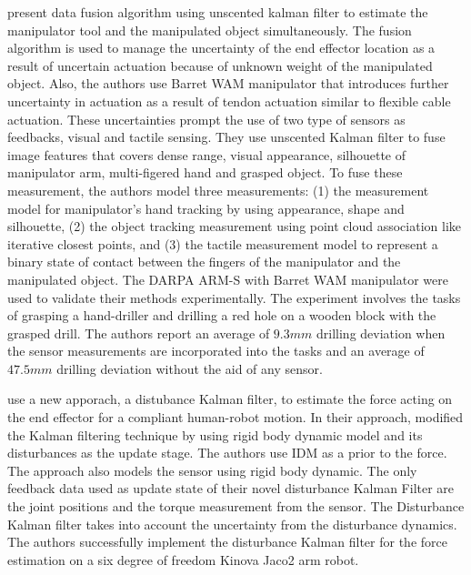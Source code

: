 \textcite{Hebert2012} present data fusion algorithm using unscented kalman filter to
estimate the manipulator tool and the manipulated object simultaneously. The fusion algorithm
is used to manage the uncertainty of the end effector location as a result of uncertain actuation
because of unknown weight of the manipulated object. Also, the authors use Barret WAM
manipulator that introduces further uncertainty in actuation as a result of tendon actuation similar
to flexible cable actuation. These uncertainties prompt the use of two type of sensors as
feedbacks, visual and tactile sensing. They use unscented Kalman filter to fuse image features
that covers dense range, visual appearance, silhouette of manipulator arm, multi-figered hand
and grasped object. To fuse these measurement, the authors model three measurements: (1)
the measurement model for manipulator’s hand tracking by using appearance, shape and
silhouette, (2) the object tracking measurement using point cloud association like iterative
closest points, and (3) the tactile measurement model to represent a binary state of contact
between the fingers of the manipulator and the manipulated object. The DARPA ARM-S
with Barret WAM manipulator were used to validate their methods experimentally. The experiment involves
the tasks of grasping a hand-driller and drilling a red hole on a wooden block with the grasped
drill. The authors report an average of $9.3 mm$ drilling deviation when the sensor measurements
are incorporated into the tasks and an average of $47.5 mm$ drilling deviation without the aid of
any sensor.

\textcite{Hu2017} use a new apporach, a distubance Kalman filter, to estimate the
force acting on the end effector for a compliant human-robot motion. In their approach, 
\textcite{Hu2017} modified the Kalman filtering technique by using rigid body dynamic model and its
disturbances as the update stage. The authors use \acrfull{IDM} as a prior to
the force. The approach also models the sensor using rigid body dynamic. The only feedback
data used as update state of their novel disturbance Kalman Filter are the joint positions and the
torque measurement from the sensor. The Disturbance Kalman filter takes into account the
uncertainty from the disturbance dynamics. The authors successfully implement the disturbance
Kalman filter for the force estimation on a six degree of freedom Kinova Jaco2 arm robot.

